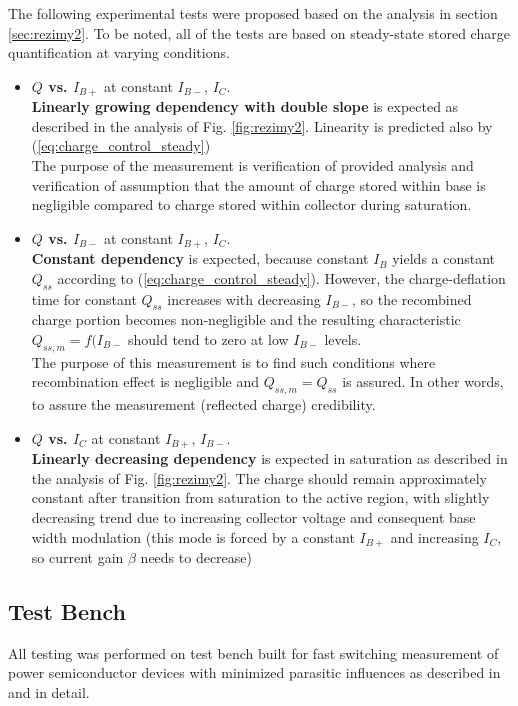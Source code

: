\documentclass[conference]{IEEEtran}
\begin{document}
The following experimental tests were proposed based on the analysis in section \ref{sec:rezimy2}. To be noted, all of the tests are based on steady-state stored charge quantification at varying conditions.
\begin{itemize}

    \item \textbf{$Q$ vs. $I_{B+}$} at constant $I_{B-}$, $I_C$.\\
	\textbf{Linearly growing dependency with double slope} is expected as described in the analysis of Fig. \ref{fig:rezimy2}. Linearity is predicted also by (\ref{eq:charge_control_steady})\\
	The purpose of the measurement is verification of provided analysis and verification of assumption that the amount of charge stored within base is negligible compared to charge stored within collector during saturation.

    \item \textbf{$Q$ vs. $I_{B-}$} at constant $I_{B+}$, $I_C$.\\
	\textbf{Constant dependency} is expected, because constant $I_{B}$ yields a constant $Q_{ss}$ according to (\ref{eq:charge_control_steady}).
	However, the charge-deflation time for constant $Q_{ss}$ increases with decreasing $I_{B-}$, so the recombined charge portion becomes non-negligible and the resulting characteristic $Q_{ss,m}=f(I_{B-}$ should tend to zero at low $I_{B-}$ levels.\\
	The purpose of this measurement is to find such conditions where recombination effect is negligible and $Q_{ss,m} = Q_{ss}$ is assured. In other words, to assure the measurement (reflected charge) credibility.

    \item \textbf{$Q$ vs. $I_{C}$} at constant $I_{B+}$, $I_{B-}$.\\
	\textbf{Linearly decreasing dependency} is expected in saturation as described in the analysis of Fig. \ref{fig:rezimy2}. The charge should remain approximately constant after transition from saturation to the active region, with slightly decreasing trend due to increasing collector voltage and consequent base width modulation (this mode is forced by a constant $I_{B+}$ and increasing $I_C$, so current gain $\beta$ needs to decrease)

\end{itemize}

\subsection{Test Bench}
All testing was performed on test bench built for fast switching measurement of power semiconductor devices with minimized parasitic influences as described in \cite{diplomovka} and \cite{prochazka} in detail.
\end{document}
